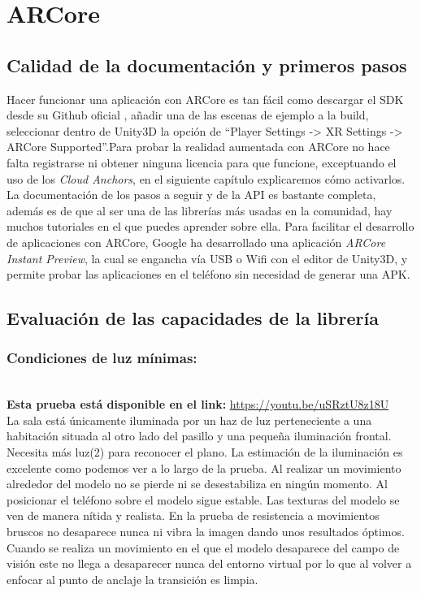\clearpage
\section{ARCore}
\subsection{Calidad de la documentación y primeros pasos}
Hacer funcionar una aplicación con ARCore es tan fácil como descargar el SDK desde su Github oficial \cite{Github_Google}, añadir una de las escenas de ejemplo a la build, seleccionar dentro de Unity3D la opción de ``Player Settings -> XR Settings -> ARCore Supported''.Para probar la realidad aumentada con ARCore no hace falta registrarse ni obtener ninguna licencia para que funcione, exceptuando el uso de los \textit{Cloud Anchors}, en el siguiente capítulo explicaremos cómo activarlos. La documentación de los pasos a seguir y de la API es bastante completa, además es de que al ser una de las librerías más usadas en la comunidad, hay muchos tutoriales en el que puedes aprender sobre ella. Para facilitar el desarrollo de aplicaciones con ARCore, Google ha desarrollado una aplicación \textit{ARCore Instant Preview}, la cual se engancha vía USB o Wifi con el editor de Unity3D, y permite probar las aplicaciones en el teléfono sin necesidad de generar una APK.
\subsection{Evaluación de las capacidades de la librería}
\subsubsection{Condiciones de luz mínimas:}\\
\textbf{Esta prueba está disponible en el link:} \url{https://youtu.be/uSRztU8z18U}\\
La sala está únicamente iluminada por un haz de luz perteneciente a una habitación situada al otro lado del pasillo y una pequeña iluminación frontal.\\

Necesita más luz(2) para reconocer el plano. La estimación de la iluminación es excelente como podemos ver a lo largo de la prueba. Al realizar un movimiento alrededor del modelo no se pierde ni se desestabiliza en ningún momento. Al posicionar el teléfono sobre el modelo sigue estable. Las texturas del modelo se ven de manera nítida y realista. En la prueba de resistencia a movimientos bruscos no desaparece nunca ni vibra la imagen dando unos resultados óptimos. Cuando se realiza un movimiento en el que el modelo desaparece del campo de visión este no llega a desaparecer nunca del entorno virtual por lo que al volver a enfocar al punto de anclaje la transición es limpia.

